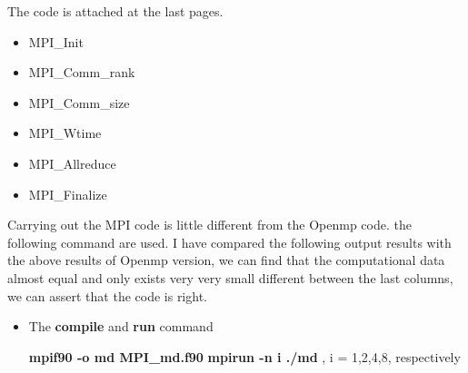 \documentclass{article}
\begin{document}
The code is attached at the last pages.
\begin{itemize}
 \item  MPI\_Init
 \item  MPI\_Comm\_rank
 \item  MPI\_Comm\_size
 \item  MPI\_Wtime
 \item MPI\_Allreduce
 \item MPI\_Finalize
\end{itemize}


Carrying out the MPI code is little different from the Openmp code. the following command are used.
I have compared the following output results with the above results of  Openmp version,  we can find that
the computational data almost equal and only exists very very small different between the last columns,
we can assert that the code is right.
\begin{itemize}
\item The \textbf{compile} and \textbf{run} command

\textbf{ mpif90 -o  md   MPI\_md.f90 }
\textbf{ mpirun -n i ./md }, i = 1,2,4,8, respectively

\end{itemize}
\end{document}
